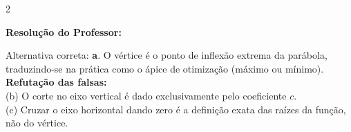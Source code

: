 \begin{multicols*}{2}
\ifgabarito
    \begin{tcolorbox}[colback=CorTitUm!5, colframe=CorTitUm, boxrule=1pt, arc=4pt, left=6pt, right=6pt, top=6pt, bottom=6pt]
    \small\textbf{\textcolor{CorTitUm}{Resolução do Professor:}}\par\vspace{0.1cm}
    \color{CinzaEscuro}
    Alternativa correta: \textbf{a}. O vértice é o ponto de inflexão extrema da parábola, traduzindo-se na prática como o ápice de otimização (máximo ou mínimo). \\
    \textbf{Refutação das falsas:} \\
    (b) O corte no eixo vertical é dado exclusivamente pelo coeficiente $c$. \\
    (c) Cruzar o eixo horizontal dando zero é a definição exata das raízes da função, não do vértice.
    \end{tcolorbox}
\fi

\par\vspace{\espacoQuestao}

\end{multicols*}
